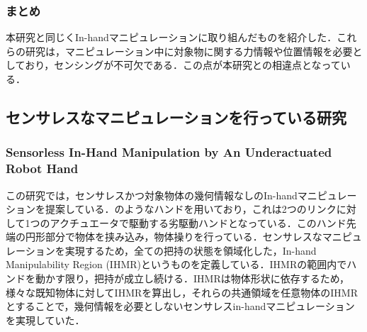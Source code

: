 \documentclass[a4paper,twoside,12pt,papersize, dvipdfmx]{iirthesis}
\begin{document}
\subsubsection{まとめ}
本研究と同じくIn-handマニピュレーションに取り組んだものを紹介した．これらの研究は，マニピュレーション中に対象物に関する力情報や位置情報を必要としており，センシングが不可欠である．この点が本研究との相違点となっている．


\subsection{センサレスなマニピュレーションを行っている研究}
\subsubsection{Sensorless In-Hand Manipulation by An Underactuated Robot Hand \cite{ospina2020}}	\label{sec::ospina}
この研究では，センサレスかつ対象物体の幾何情報なしのIn-handマニピュレーションを提案している．のようなハンドを用いており，これは2つのリンクに対して1つのアクチュエータで駆動する劣駆動ハンドとなっている．このハンド先端の円形部分で物体を挟み込み，物体操りを行っている．センサレスなマニピュレーションを実現するため，全ての把持の状態を領域化した，In-hand Manipulability Region (IHMR)というものを定義している．IHMRの範囲内でハンドを動かす限り，把持が成立し続ける．IHMRは物体形状に依存するため，様々な既知物体に対してIHMRを算出し，それらの共通領域を任意物体のIHMRとすることで，幾何情報を必要としないセンサレスin-handマニピュレーションを実現していた．
\end{document}
